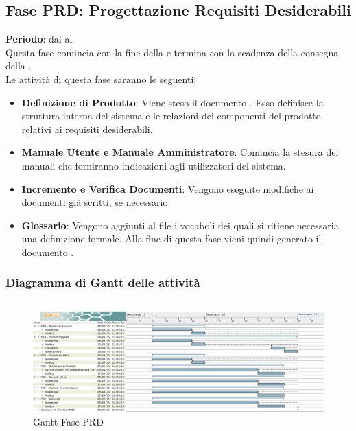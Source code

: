 \subsection{Fase PRD: Progettazione Requisiti Desiderabili}
	\textbf{Periodo}: dal  al  \\Questa fase comincia con la fine della  e termina con la scadenza della consegna della .\\Le attività di questa fase saranno le seguenti:
	\begin{itemize}
		\item\textbf{Definizione di Prodotto}: Viene steso il documento . Esso definisce la struttura interna del sistema e le relazioni dei componenti del prodotto relativi ai requisiti desiderabili.
		\item\textbf{Manuale Utente e Manuale Amministratore}: Comincia la stesura dei manuali che forniranno indicazioni agli utilizzatori del sistema.
		\item\textbf{Incremento e Verifica Documenti}: Vengono eseguite modifiche ai documenti già scritti, se necessario.
		\item\textbf{Glossario}: Vengono aggiunti al file  i vocaboli dei quali si ritiene necessaria una definizione formale. Alla fine di questa fase vieni quindi generato il documento .
	\end{itemize}
	\subsubsection{Diagramma di Gantt delle attività}
	\begin{figure}[H]\centering
		\includegraphics[width=\textwidth]{PianoDiProgetto/Pics/FasePRD.png}
	\caption{Gantt Fase PRD}
\end{figure}